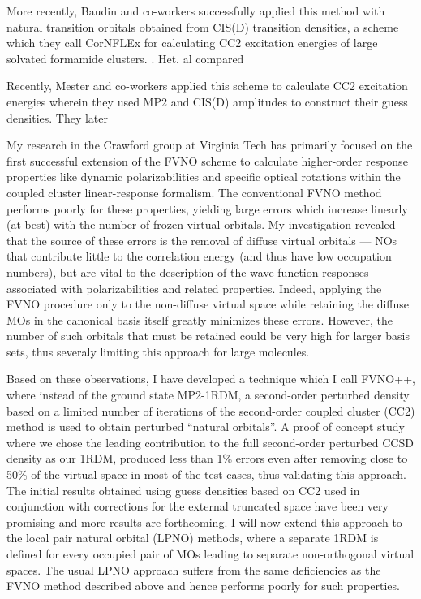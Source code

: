 \cite{} More recently, Baudin and co-workers
successfully applied this method with natural transition orbitals
obtained from  CIS(D) transition densities, a scheme which they call CorNFLEx
for calculating CC2 excitation energies of large solvated formamide clusters.
\cite{}. H\ofener et. al compared 

Recently, Mester and co-workers applied
this scheme to calculate CC2 excitation energies wherein they used MP2 and 
CIS(D) amplitudes to construct their guess densities\cite{}. They later


My research in the Crawford group at Virginia Tech has primarily focused on
the first successful extension of the FVNO scheme to calculate higher-order
response properties like dynamic polarizabilities and specific optical
rotations within the coupled cluster linear-response formalism. The
conventional FVNO method performs poorly for these properties, yielding large
errors which increase linearly (at best) with the number of frozen virtual
orbitals.\cite{Kumar17} My investigation revealed that the source of these
errors is the removal of diffuse virtual orbitals --- NOs that contribute
little to the correlation energy (and thus have low occupation numbers), but
are vital to the description of the wave function responses associated with
polarizabilities and related properties.  Indeed, applying the FVNO procedure
only to the non-diffuse virtual space while retaining the diffuse MOs in the
canonical basis itself greatly minimizes these errors.  However, the number 
of such orbitals that must be retained could be very high for larger basis
sets, thus severaly limiting this approach for large molecules.  

Based on these observations, I have developed a technique which I call FVNO++,
where instead of the ground state MP2-1RDM, a second-order perturbed density
based on a limited number of iterations of the second-order coupled cluster
(CC2) method is used to obtain perturbed ``natural orbitals''. A proof of
concept study where we chose the leading contribution to the full second-order
perturbed CCSD density as our 1RDM, produced less than 1\% errors even after
removing close to 50\% of the virtual space in most of the test cases, thus
validating this approach. The initial results obtained using guess densities
based on CC2 used in conjunction with corrections for the external truncated
space have been very promising and more results are forthcoming.
I will now extend this approach to the local pair natural orbital (LPNO)
methods, where a separate 1RDM is defined for every occupied pair of MOs
leading to separate non-orthogonal virtual spaces. The usual LPNO approach
suffers from the same deficiencies as the FVNO method described above and hence
performs poorly for such properties.\cite{McAlexander15:LRCC}


